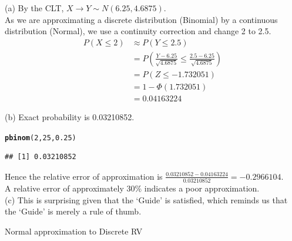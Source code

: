 \documentclass[bigtut]{tutorial}\usepackage[]{graphicx}\usepackage[]{color}
\makeatletter
\newcommand{\hlnum}[1]{\textcolor[rgb]{0.686,0.059,0.569}{#1}}%
\newcommand{\hlstd}[1]{\textcolor[rgb]{0.345,0.345,0.345}{#1}}%
\newcommand{\hlkwd}[1]{\textcolor[rgb]{0.737,0.353,0.396}{\textbf{#1}}}%
\newenvironment{kframe}{%
 \def\at@end@of@kframe{}%
 \ifinner\ifhmode%
  \def\at@end@of@kframe{\end{minipage}}%
  \begin{minipage}{\columnwidth}%
 \fi\fi%
 \def\FrameCommand##1{\hskip\@totalleftmargin \hskip-\fboxsep
 \colorbox{shadecolor}{##1}\hskip-\fboxsep
     \hskip-\linewidth \hskip-\@totalleftmargin \hskip\columnwidth}%
 \MakeFramed {\advance\hsize-\width
   \@totalleftmargin\z@ \linewidth\hsize
   \@setminipage}}%
 {\par\unskip\endMakeFramed%
 \at@end@of@kframe}
\newenvironment{knitrout}{}{} %
\makeatother
\begin{document}
\begin{tutorial}
\begin{questions}



\begin{solution}
(a)
By the CLT, $X \rightarrow Y \sim N(6.25,4.6875)$. \\

As we are approximating a discrete distribution (Binomial) by a continuous distribution (Normal), we use a continuity correction and  change 2 to 2.5.
\begin{align*} 
P(X \leq 2) & \approx P(Y \leq 2.5) \\
& = P( \frac {Y - 6.25}{\sqrt{4.6875}} \leq \frac{2.5-6.25}{\sqrt{4.6875}} ) \\
& = P(Z \leq -1.732051 ) \\
& = 1-\Phi(1.732051) \\
& = 0.04163224
\end{align*}

(b)
Exact probability is 0.03210852.
\begin{knitrout}
\color{fgcolor}\begin{kframe}
\begin{alltt}
\hlkwd{pbinom}\hlstd{(}\hlnum{2}\hlstd{,}\hlnum{25}\hlstd{,}\hlnum{0.25}\hlstd{)}
\end{alltt}
\begin{verbatim}
## [1] 0.03210852
\end{verbatim}
\end{kframe}
\end{knitrout}

Hence the relative error of approximation is $\frac{0.03210852 -  0.04163224}{0.03210852} = -0.2966104$. \\

A relative error of approximately 30\% indicates a poor approximation.  \\

(c)
This is surprising given that the `Guide' is satisfied, which reminds us that the `Guide' is merely a rule of thumb.
\end{solution}

\question Normal approximation to Discrete RV \\


\end{questions}
\end{tutorial}
\end{document}
